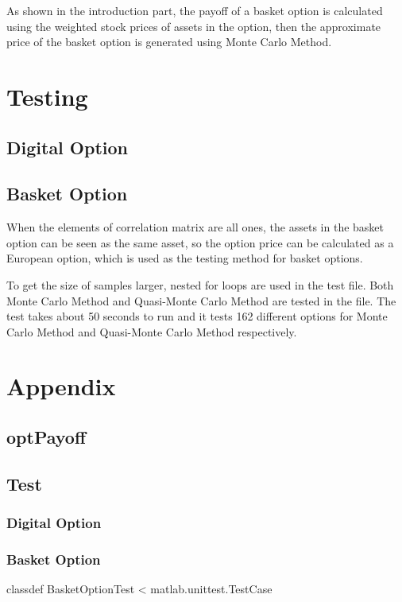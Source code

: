 \documentclass[]{elsarticle}
\theoremstyle{definition}
\theoremstyle{remark}
\begin{document}
As shown in the introduction part, the payoff of a basket option is calculated using the weighted stock prices of assets in the option, then the approximate price of the basket option is generated using Monte Carlo Method.

\section{Testing}
\subsection{Digital Option}



\subsection{Basket Option}
When the elements of correlation matrix are all ones, the assets in the basket option can be seen as the same asset, so the option price can be calculated as a European option, which is used as the testing method for basket options.

To get the size of samples larger, nested for loops are used in the test file. Both Monte Carlo Method and Quasi-Monte Carlo Method are tested in the file. The test takes about 50 seconds to run and it tests 162 different options for Monte Carlo Method and Quasi-Monte Carlo Method respectively.

\section*{Appendix}
\subsection*{optPayoff}
\subsection*{Test}
\subsubsection*{Digital Option}
\subsubsection*{Basket Option}
classdef BasketOptionTest < matlab.unittest.TestCase\\
    
\end{document}
